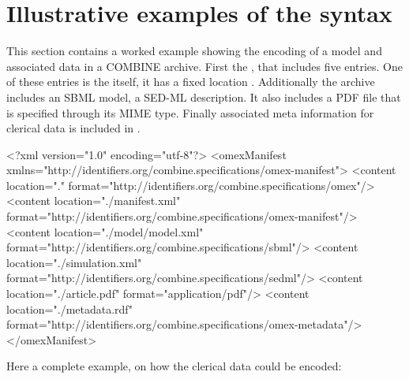 
\section{Illustrative examples of the syntax}
\label{examples}

This section contains a worked example showing the encoding of a model 
and associated data in a COMBINE archive. First the \OmexManifest, that 
includes five entries. One of these entries is the \OmexManifest itself, 
it has a fixed location . Additionally 
the archive includes an SBML model, a SED-ML description. It also 
includes a PDF file that is specified through its MIME type. Finally 
associated meta information for clerical data is included in 
. 


\begin{example}
<?xml version="1.0" encoding="utf-8"?>
<omexManifest xmlns="http://identifiers.org/combine.specifications/omex-manifest">
    <content location="." 
		         format="http://identifiers.org/combine.specifications/omex"/>
    <content location="./manifest.xml" 
		         format="http://identifiers.org/combine.specifications/omex-manifest"/>
    <content location="./model/model.xml" 
		         format="http://identifiers.org/combine.specifications/sbml"/>
    <content location="./simulation.xml" 
		         format="http://identifiers.org/combine.specifications/sedml"/>
    <content location="./article.pdf" 
		         format="application/pdf"/>
    <content location="./metadata.rdf" 
		         format="http://identifiers.org/combine.specifications/omex-metadata"/>
</omexManifest>
\end{example}

Here a complete example, on how the clerical data could be encoded: 

